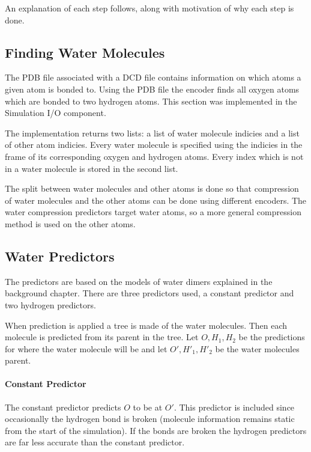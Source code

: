\documentclass[a4paper]{report}
\begin{document}
An explanation of each step follows, along with motivation of why each step is
done.


\subsection{Finding Water Molecules}

The PDB file associated with a DCD file contains information on which atoms a
given atom is bonded to. Using the PDB file the encoder finds all oxygen atoms
which are bonded to two hydrogen atoms. This section was implemented in the
Simulation I/O component.

The implementation returns two lists: a list of water molecule indicies and a
list of other atom indicies. Every water molecule is specified using the
indicies in the frame of its corresponding oxygen and hydrogen atoms. Every
index which is not in a water molecule is stored in the second list.

The split between water molecules and other atoms is done so that compression
of water molecules and the other atoms can be done using different
encoders. The water compression predictors target water atoms, so a more
general compression method is used on the other atoms.


\subsection{Water Predictors}
\label{sec:water-predictors}

The predictors are based on the models of water dimers explained in the
background chapter. There are three predictors used, a constant predictor and
two hydrogen predictors.

When prediction is applied a tree is made of the water molecules. Then each
molecule is predicted from its parent in the tree. Let $O, H_1, H_2$ be the
predictions for where the water molecule will be and let $O', H'_1, H'_2$ be
the water molecules parent.

\paragraph{Constant Predictor}
The constant predictor predicts $O$ to be at $O'$. This predictor is included
since occasionally the hydrogen bond is broken (molecule information remains
static from the start of the simulation). If the bonds are broken the hydrogen
predictors are far less accurate than the constant predictor.
\end{document}
